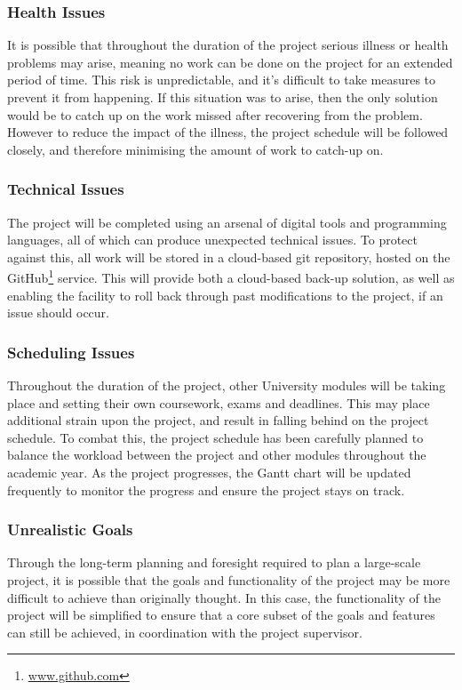 \documentclass[12pt,a4paper]{article}
\begin{document}
\subsubsection{Health Issues}
It is possible that throughout the duration of the project serious illness or health problems may arise, meaning no work can be done on the project for an extended period of time. This risk is unpredictable, and it's difficult to take measures to prevent it from happening. If this situation was to arise, then the only solution would be to catch up on the work missed after recovering from the problem. However to reduce the impact of the illness, the project schedule will be followed closely, and therefore minimising the amount of work to catch-up on.

\subsubsection{Technical Issues}
The project will be completed using an arsenal of digital tools and programming languages, all of which can produce unexpected technical issues. To protect against this, all work will be stored in a cloud-based git repository, hosted on the GitHub\footnote{\url{www.github.com}} service. This will provide both a cloud-based back-up solution, as well as enabling the facility to roll back through past modifications to the project, if an issue should occur.

\subsubsection{Scheduling Issues}
Throughout the duration of the project, other University modules will be taking place and setting their own coursework, exams and deadlines. This may place additional strain upon the project, and result in falling behind on the project schedule. To combat this, the project schedule has been carefully planned to balance the workload between the project and other modules throughout the academic year. As the project progresses, the Gantt chart will be updated frequently to monitor the progress and ensure the project stays on track.

\subsubsection{Unrealistic Goals}
Through the long-term planning and foresight required to plan a large-scale project, it is possible that the goals and functionality of the project may be more difficult to achieve than originally thought. In this case, the functionality of the project will be simplified to ensure that a core subset of the goals and features can still be achieved, in coordination with the project supervisor.
\end{document}
